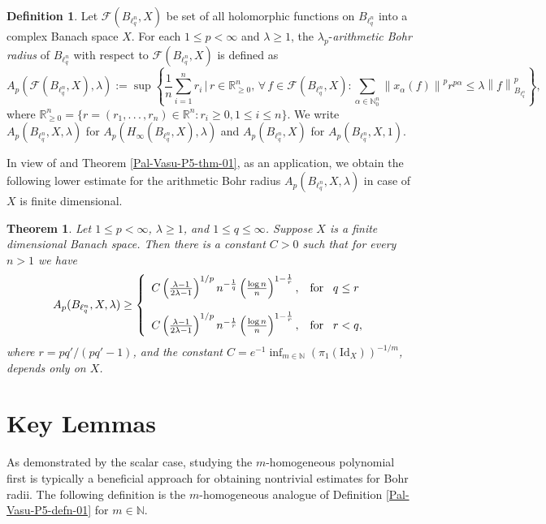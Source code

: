 \documentclass[a4paper,12pt]{amsart}
\newtheorem{thm}{Theorem}[section]
\theoremstyle{definition}
\newtheorem{defn}{Definition}[section]
\newcommand{\norm}[1]{\left\lVert#1\right\rVert}
\begin{document}
\begin{defn}\cite{Subhadip-Vasu-P3}
	Let $\mathcal{F}(B_{\ell^n_q},X)$ be set of all holomorphic functions on $B_{\ell^n_q}$ into a complex Banach space $X$. For each $1\leq p<\infty$ and $\lambda\geq 1$, the $\lambda_{p}$-\textit{arithmetic Bohr radius} of $B_{\ell^n_q}$ with respect to $\mathcal{F}(B_{\ell^n_q}, X)$ is defined as 
	\begin{equation*}
		A_{p}(\mathcal{F}(B_{\ell^n_q}, X), \lambda) := \sup \left\{\frac{1}{n}\sum_{i=1}^{n}r_i \,|\, r\in \mathbb{R}^{n}_{\geq 0},\, \forall\, f\in \mathcal{F}(B_{\ell^n_q}, X) : \sum_{\alpha \in \mathbb{N}^{n}_{0}}\norm{x_{\alpha}(f)}^p r^{p\alpha} \leq \lambda \norm{f}^{p}_{B_{\ell^n_q}}\right\},
	\end{equation*} 
	where $\mathbb{R}^n_{\geq 0}=\{r=(r_1,.\,.\,.\,, r_n) \in \mathbb{R}^n: r_i\geq 0, 1\leq i\leq n\}.$  We write $A_p(B_{\ell^n_q},X,\lambda)$ for $A_p(H_{\infty}(B_{\ell^n_q},X),\lambda)$ and $A_p(B_{\ell^n_q},X)$ for $A_p(B_{\ell^n_q},X,1)$.
\end{defn}
In view of \cite[Theorem 2.2]{Subhadip-Vasu-P3} and Theorem \ref{Pal-Vasu-P5-thm-01}, as an application, we obtain the following lower estimate for the arithmetic Bohr radius $A_p(B_{\ell^n_q},X,\lambda)$ in case of $X$ is finite dimensional.
\begin{thm}
	Let $1\leq p<\infty$, $\lambda\geq 1$, and $1\leq q\leq \infty$. Suppose $X$ is a finite dimensional Banach space. Then there is a constant $C>0$ such that for every $n>1$ we have
	$$
	A_{p}(B_{\ell^n_q},X,\lambda)\geq \left\{\begin{array}{ll}
		C\left(\frac{\lambda-1}{2\lambda-1}\right)^{1/p} n^{-\frac{1}{q}}\left(\frac{\log n}{n}\right)^{1-\frac{1}{r}}, & \mbox{for \, $q\leq r$}\\[5mm] 
		
		C\left(\frac{\lambda-1}{2\lambda-1}\right)^{1/p} n^{-\frac{1}{r}}\left(\frac{\log n}{n}\right)^{1-\frac{1}{r}}, & \mbox{for \, $r<q$},
	\end{array}\right.
	$$
	where $r=pq'/(pq'-1)$, and the constant $C=e^{-1}\inf_{m\in \mathbb{N}}(\pi_{1}(\mbox{Id}_{X}))^{-1/m}$, depends only on $X$.
\end{thm}
\section{Key Lemmas}\label{Pal-Vasu-P5-section-04}
\allowdisplaybreaks
As demonstrated by the scalar case, studying the $m$-homogeneous polynomial first is typically a beneficial approach for obtaining nontrivial estimates for Bohr radii. The following definition is the $m$-homogeneous analogue of Definition \ref{Pal-Vasu-P5-defn-01} for $m\in \mathbb{N}$.
\end{document}
